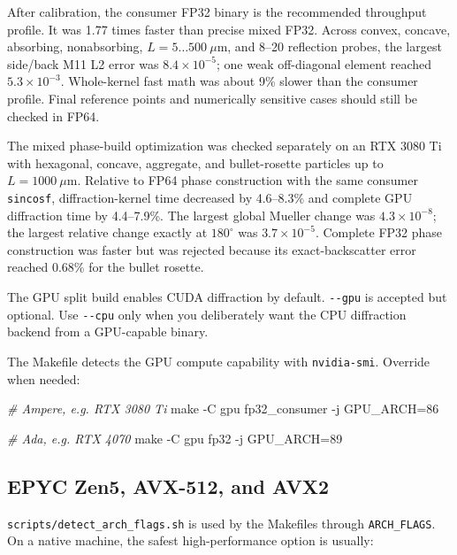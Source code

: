 \documentclass[
  10pt,
  a4paper,
]{article}
\newenvironment{Shaded}{}{}
\newcommand{\AttributeTok}[1]{\textcolor[rgb]{0.49,0.56,0.16}{#1}}
\newcommand{\CommentTok}[1]{\textcolor[rgb]{0.38,0.63,0.69}{\textit{#1}}}
\newcommand{\FunctionTok}[1]{\textcolor[rgb]{0.02,0.16,0.49}{#1}}
\newcommand{\NormalTok}[1]{#1}
\begin{document}
After calibration, the consumer FP32 binary is the recommended throughput
profile. It was 1.77 times faster than precise mixed FP32. Across convex,
concave, absorbing, nonabsorbing, $L=5\ldots500\ \mu\mathrm{m}$, and 8--20
reflection probes, the largest side/back M11 L2 error was $8.4\times10^{-5}$;
one weak off-diagonal element reached $5.3\times10^{-3}$. Whole-kernel fast
math was about 9\% slower than the consumer profile. Final reference points
and numerically sensitive cases should still be checked in FP64.

The mixed phase-build optimization was checked separately on an RTX 3080 Ti
with hexagonal, concave, aggregate, and bullet-rosette particles up to
$L=1000\ \mu\mathrm{m}$. Relative to FP64 phase construction with the same
consumer \texttt{sincosf}, diffraction-kernel time decreased by 4.6--8.3\%
and complete GPU diffraction time by 4.4--7.9\%. The largest global Mueller
change was $4.3\times10^{-8}$; the largest relative change exactly at
$180^\circ$ was $3.7\times10^{-5}$. Complete FP32 phase construction was
faster but was rejected because its exact-backscatter error reached 0.68\%
for the bullet rosette.

The GPU split build enables CUDA diffraction by default.
\texttt{-\/-gpu} is accepted but optional. Use \texttt{-\/-cpu} only
when you deliberately want the CPU diffraction backend from a
GPU-capable binary.

The Makefile detects the GPU compute capability with
\texttt{nvidia-smi}. Override when needed:

\begin{Shaded}
\begin{Highlighting}[]
\CommentTok{\# Ampere, e.g. RTX 3080 Ti}
\FunctionTok{make} \AttributeTok{{-}C}\NormalTok{ gpu fp32\_consumer }\AttributeTok{{-}j}\NormalTok{ GPU\_ARCH=86}

\CommentTok{\# Ada, e.g. RTX 4070}
\FunctionTok{make} \AttributeTok{{-}C}\NormalTok{ gpu fp32 }\AttributeTok{{-}j}\NormalTok{ GPU\_ARCH=89}
\end{Highlighting}
\end{Shaded}

\subsection{EPYC Zen5, AVX-512, and
AVX2}\label{epyc-zen5-avx-512-and-avx2}

\texttt{scripts/detect\_arch\_flags.sh} is used by the Makefiles through
\texttt{ARCH\_FLAGS}. On a native machine, the safest high-performance
option is usually:
\end{document}
